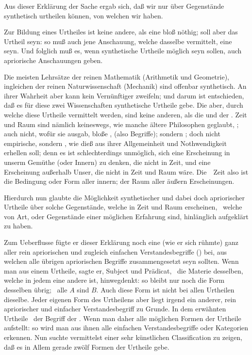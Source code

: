\begin{aufza}
\item Aus dieser Erklärung der Sache ergab sich, daß wir nur über  Gegenstände synthetisch urtheilen können, von welchen wir  haben.
\item Zur Bildung eines  Urtheiles ist keine andere, als eine bloß  nöthig; soll aber das Urtheil  seyn: so muß auch jene Anschauung, welche dasselbe vermittelt, eine  seyn. Und folglich muß es, wenn synthetische Urtheile  möglich seyn sollen, auch apriorische Anschauungen geben.
\item Die meisten Lehrsätze der reinen Mathematik (Arithmetik und Geometrie), ingleichen der reinen Naturwissenschaft (Mechanik) sind offenbar synthetisch. An ihrer Wahrheit aber kann kein Vernünftiger zweifeln; und darum ist entschieden, daß es für diese zwei Wissenschaften synthetische Urtheile  gebe. Die  aber, durch welche diese Urtheile vermittelt werden, sind keine anderen, als die  und der . Zeit und Raum sind nämlich keineswegs, wie manche ältere Philosophen geglaubt, ; auch nicht, wofür sie  ausgab, bloße , (also Begriffe); sondern ; doch nicht empirische, sondern , wie dieß aus ihrer Allgemeinheit und Nothwendigkeit erhellen soll; denn es ist schlechterdings unmöglich, sich eine Erscheinung in unserm Gemüthe (oder Innern) zu denken, die nicht in Zeit, und eine Erscheinung außerhalb Unser, die nicht in Zeit und Raum wäre. Die~\ Zeit also ist die Bedingung oder Form aller innern; der Raum aller äußern Erscheinungen.
\item Hierdurch nun glaubte  die Möglichkeit synthetischer und dabei doch apriorischer Urtheile über solche Gegenstände, welche in Zeit und Raum erscheinen, \dh\ welche von  Art, oder Gegenstände einer möglichen Erfahrung sind, hinlänglich aufgeklärt zu haben.
\item Zum Ueberflusse fügte er dieser Erklärung noch eine (wie er sich rühmte) ganz  aller rein apriorischen und zugleich einfachen Verstandesbegriffe () bei, aus welchen alle übrigen apriorischen Begriffe zusammengesetzt seyn sollten. Wenn man aus einem Urtheile, sagte er, Subject und Prädicat, \dh\ die Materie desselben, welche in jedem eine andere ist, hinwegdenkt: so bleibt nur noch die Form desselben übrig; \zB\ alle $A$ sind $B$. Auch diese Form ist nicht bei allen Urtheilen dieselbe. Jeder eigenen Form des Urtheilens aber liegt irgend ein anderer, rein apriorischer und einfacher Verstandesbegriff zu Grunde. In dem erwähnten Urtheile \zB\ der Begriff der . Wenn man daher alle möglichen Formen der Urtheile aufstellt: so wird man aus ihnen alle einfachen Verstandesbegriffe oder Kategorien erkennen. Nun suchte  vermittelst einer sehr künstlichen Classification zu zeigen, daß es in Allem gerade zwölf Formen der Urtheile gebe.

\end{aufza}
